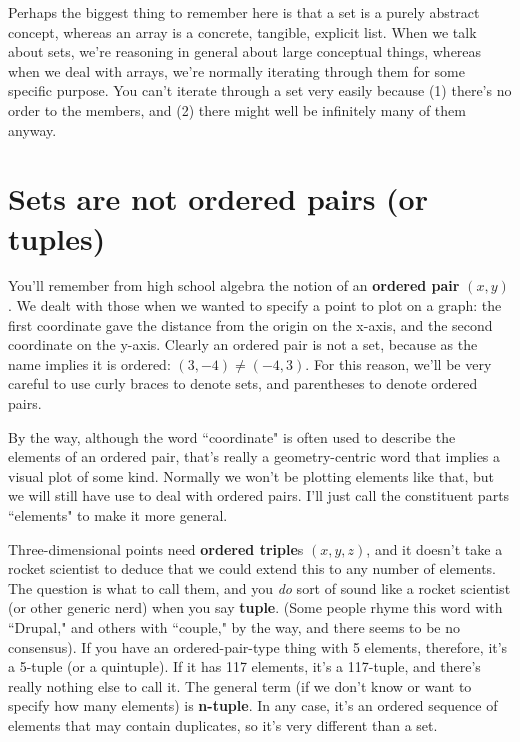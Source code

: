 \begin{itemize}
\end{itemize}

Perhaps the biggest thing to remember here is that a set is a purely
abstract concept, whereas an array is a concrete, tangible, explicit list.
When we talk about sets, we're reasoning in general about large conceptual
things, whereas when we deal with arrays, we're normally iterating through
them for some specific purpose. You can't iterate through a set very easily
because (1) there's no order to the members, and (2) there might well be
infinitely many of them anyway.


\section{Sets are not ordered pairs (or tuples)}

You'll remember from high school algebra the notion of an \textbf{ordered
pair} $(x,y)$.  We dealt with those when we wanted to
specify a point to plot on a graph: the first coordinate gave the distance
from the origin on the x-axis, and the second coordinate on the y-axis.
Clearly an ordered pair is not a set, because as the name implies it is
ordered: $(3,-4) \neq (-4,3)$. For this reason, we'll be very careful to
use curly braces to denote sets, and parentheses to denote ordered pairs.

By the way, although the word ``coordinate" is often used to describe the
elements of an ordered pair, that's really a geometry-centric word that
implies a visual plot of some kind. Normally we won't be plotting elements
like that, but we will still have use to deal with ordered pairs. I'll just
call the constituent parts ``elements" to make it more general.
 

Three-dimensional points need \textbf{ordered triple}s $(x,y,z)$,
 and it doesn't take a rocket scientist to deduce
that we could extend this to any number of elements. The question is what
to call them, and you \textit{do} sort of sound like a rocket scientist (or
other generic nerd) when you say \textbf{tuple}.  (Some
people rhyme this word with ``Drupal," and others with ``couple," by the
way, and there seems to be no consensus). If you have an ordered-pair-type
thing with 5 elements, therefore, it's a 5-tuple (or a quintuple). If it
has 117 elements, it's a 117-tuple, and there's really nothing else to call
it. The general term (if we don't know or want to specify how many
elements) is \textbf{n-tuple}.  In any case, it's an
ordered sequence of elements that may contain duplicates, so it's very
different than a set.


